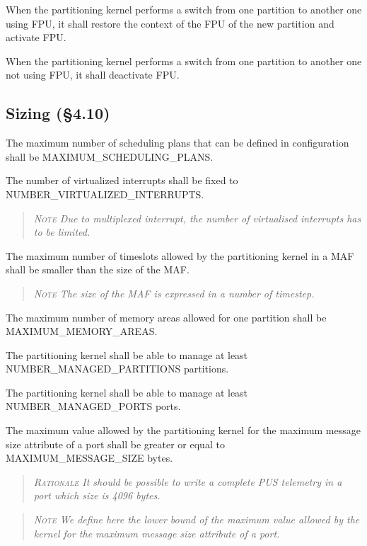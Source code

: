 When the partitioning kernel performs a switch from one partition to another one using FPU, it shall restore the context of the FPU of the new partition and activate FPU.

When the partitioning kernel performs a switch from one partition to another one not using FPU, it shall deactivate FPU.

\subsection{Sizing (\S4.10)}

The maximum number of scheduling plans that can be defined in configuration shall be MAXIMUM\_SCHEDULING\_PLANS.

The number of virtualized interrupts shall be fixed to NUMBER\_VIRTUALIZED\_INTERRUPTS.
\begin{quote}\it
\textsc{Note}
Due to multiplexed interrupt, the number of virtualised interrupts has to be limited.
\end{quote}

The maximum number of timeslots allowed by the partitioning kernel in a MAF shall be smaller than the size of the MAF.
\begin{quote}\it
\textsc{Note}
The size of the MAF is expressed in a number of timestep.
\end{quote}

The maximum number of memory areas allowed for one partition shall be MAXIMUM\_MEMORY\_AREAS.

The partitioning kernel shall be able to manage at least NUMBER\_MANAGED\_PARTITIONS partitions.

The partitioning kernel shall be able to manage at least NUMBER\_MANAGED\_PORTS ports.

The maximum value allowed by the partitioning kernel for the maximum message size attribute of a port shall be greater or equal to MAXIMUM\_MESSAGE\_SIZE bytes.
\begin{quote}\it
\textsc{Rationale}
It should be possible to write a complete PUS telemetry in a port which size is 4096 bytes.
\end{quote}
\begin{quote}\it
\textsc{Note}
We define here the lower bound of the maximum value allowed by the kernel for the maximum message size attribute of a port.
\end{quote}

